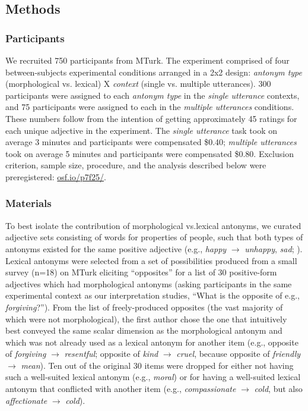 \documentclass[floatsintext,doc]{apa6}
\begin{document}
\subsection{Methods}
\subsubsection{Participants}\label{participants-1}

We recruited 750 participants from MTurk.
The experiment comprised of four between-subjects experimental conditions arranged in a 2x2 design: \emph{antonym type} (morphological vs. lexical) X \emph{context} (single vs. multiple utterances).
300 participants were assigned to each \emph{antonym type} in the \emph{single utterance} contexts, and 75 participants were assigned to each in the \emph{multiple utterances} conditions.
These numbers follow from the intention of getting approximately 45 ratings for each unique adjective in the experiment.
The \emph{single utterance} task took on average 3 minutes and participants were compensated \$0.40; \emph{multiple utterances} took on average 5 minutes and participants were compensated \$0.80.
Exclusion criterion, sample size, procedure, and the analysis described below were preregistered: \url{osf.io/p7f25/}.

\subsubsection{Materials}\label{materials-1}

To best isolate the contribution of morphological vs.\text{~}lexical antonyms, we curated adjective sets consisting of words for properties of people, such that both types of antonyms existed for the same positive adjective (e.g., \emph{happy} \(\rightarrow\) \emph{unhappy}, \emph{sad}; ).
Lexical antonyms were selected from a set of possibilities produced from a small survey (n=18) on MTurk eliciting \enquote{opposites} for a list of 30 positive-form adjectives which had morphological antonyms (asking participants in the same experimental context as our interpretation studies, \enquote{What is the opposite of e.g., \emph{forgiving}?}).
From the list of freely-produced opposites (the vast majority of which were not morphological), the first author chose the one that intuitively best conveyed the same scalar dimension as the morphological antonym and which was not already used as a lexical antonym for another item (e.g., opposite of \emph{forgiving} \(\rightarrow\) \emph{resentful}; opposite of \emph{kind} \(\rightarrow\) \emph{cruel}, because opposite of \emph{friendly} \(\rightarrow\) \emph{mean}).
Ten out of the original 30 items were dropped for either not having such a well-suited lexical antonym (e.g., \emph{moral}) or for having a well-suited lexical antonym that conflicted with another item (e.g., \emph{compassionate} \(\rightarrow\) \emph{cold}, but also \emph{affectionate} \(\rightarrow\) \emph{cold}).
\end{document}
